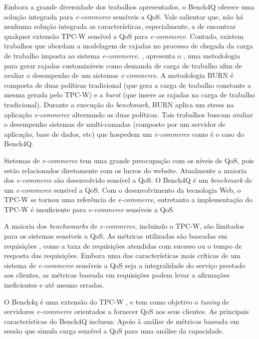 Embora a grande diversidade dos trabalhos apresentados, o Bench4Q oferece uma solução integrada para \textit{e-commerce} sensíveis a QoS. Vale salientar que, não há nenhuma solução integrada as características, especialmente, a de encontrar qualquer extensão TPC-W sensível a QoS para \textit{e-commerce}. Contudo, existem trabalhos que abordam a modelagem de rajadas no processo de chegada da carga de trabalho imposta ao sistema \textit{e-commerce}. \cite{Casale2012}, apresenta o , uma metodologia para gerar rajadas customizáveis como demanda de carga de trabalho afim de avaliar o desempenho de um sistemas \textit{e-commerce}. A metodologia BURN é composta de duas políticas tradicional (que gera a carga de trabalho constante a mesma gerada pelo TPC-W) e a \textit{burst} (que insere as rajadas na carga de trabalho tradicional). Durante a execução do \textit{benchmark}, BURN aplica um stress na aplicação \textit{e-commerce} alternando as duas políticas. Tais trabalhos buscam avaliar o desempenho sistemas de multi-camadas (composto por um servidor de aplicação, base de dados, etc) que hospedem um \textit{e-commerce} como é o caso do Bench4Q.


Sistemas de \textit{e-commerce} tem uma grande preocupação com os níveis de QoS, pois estão relacionados diretamente com os lucros do website. Atualmente a maioria dos \textit{e-commerce} são desenvolvido sensível a QoS. O Bench4Q é um \textit{benchmark} de um \textit{e-commerce} sensível a QoS.  Com o desenvolvimento da tecnologia Web, o TPC-W se tornou uma referência de \textit{e-commerce}, entretanto a implementação do TPC-W é insuficiente para \textit{e-commerce} sensíveis a QoS.

A maioria dos \textit{benchamarks} de \textit{e-commerce}, incluindo o TPC-W, são limitados para os sistemas sensíveis a QoS. As métricas utilizadas são baseadas em requisições , como a taxa de requisições atendidas com sucesso ou o tempo de resposta das requisições. Embora uma das características mais críticas de um sistema de \textit{e-commerce} sensíveis a QoS seja a integralidade do serviço prestado aos clientes, as métricas baseada em requisições podem levar a afirmações ineficientes e até mesmo erradas.

O Bench4q é uma extensão do TPC-W \cite{Menasce2002}, e tem como objetivo o \textit{tuning} de servidores \textit{e-commerce} orientados a fornecer QoS aos seus clientes. As principais características do Bench4Q incluem: 
Apoio à análise de métricas baseada em sessão que simula carga sensível a QoS para uma análise da capacidade. 

